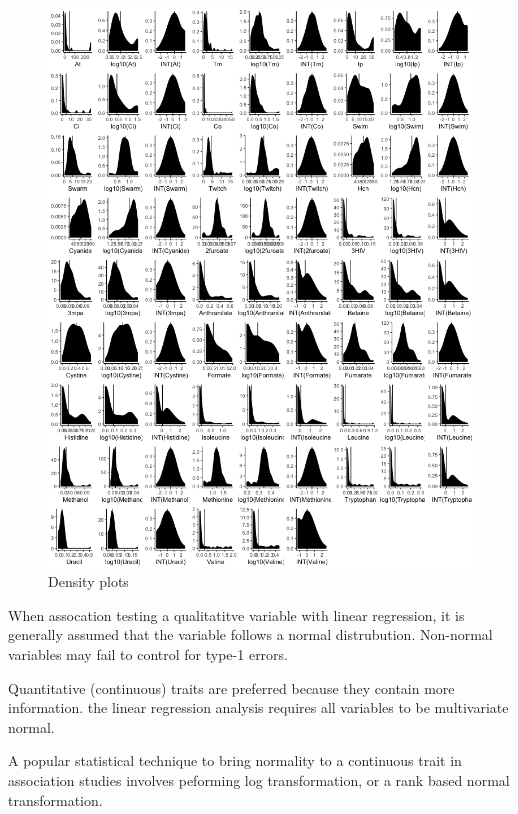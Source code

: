 \documentclass[]{DissertateUSU}
\begin{document}
\begin{figure}

{\centering \includegraphics[height=0.9\textheight]{_static/dens} 

}

\caption{\label{fig:dens}Density plots}\label{fig:unnamed-chunk-7}
\end{figure}

When assocation testing a qualitatitve variable with linear regression,
it is generally assumed that the variable follows a normal distrubution.
Non-normal variables may fail to control for type-1 errors.

Quantitative (continuous) traits are preferred because they contain more
information. the linear regression analysis requires all variables to be
multivariate normal.

A popular statistical technique to bring normality to a continuous trait
in association studies involves peforming log transformation, or a rank
based normal transformation.
\end{document}
